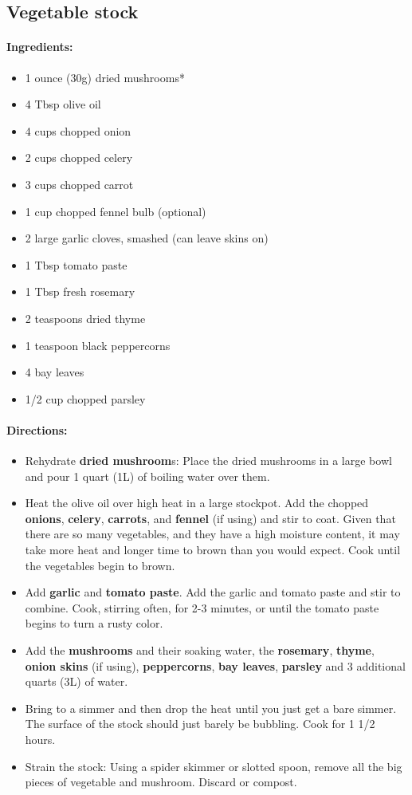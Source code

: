 \documentclass{article}
\begin{document}
\subsection{Vegetable stock}

\paragraph{Ingredients:}
\begin{itemize}
	\item 1 ounce (30g) dried mushrooms*
	\item 4 Tbsp olive oil
	\item 4 cups chopped onion
	\item 2 cups chopped celery
	\item 3 cups chopped carrot
	\item 1 cup chopped fennel bulb (optional)
	\item 2 large garlic cloves, smashed (can leave skins on)
	\item 1 Tbsp tomato paste
	\item 1 Tbsp fresh rosemary
	\item 2 teaspoons dried thyme
	\item 1 teaspoon black peppercorns
	\item 4 bay leaves
	\item 1/2 cup chopped parsley
\end{itemize}

\paragraph{Directions:}
\begin{itemize}
	\item Rehydrate \textbf{dried mushroom}s: Place the dried mushrooms in a large bowl and pour 1 quart (1L) of boiling water over them.
	\item Heat the olive oil over high heat in a large stockpot. Add the chopped \textbf{onions}, \textbf{celery}, \textbf{carrots}, and \textbf{fennel} (if using) and stir to coat. Given that there are so many vegetables, and they have a high moisture content, it may take more heat and longer time to brown than you would expect. Cook until the vegetables begin to brown.
	\item Add \textbf{garlic} and \textbf{tomato paste}. Add the garlic and tomato paste and stir to combine. Cook, stirring often, for 2-3 minutes, or until the tomato paste begins to turn a rusty color.
	\item Add the \textbf{mushrooms} and their soaking water, the \textbf{rosemary}, \textbf{thyme}, \textbf{onion skins} (if using), \textbf{peppercorns},\textbf{ bay leaves}, \textbf{parsley} and 3 additional quarts (3L) of water.
	\item Bring to a simmer and then drop the heat until you just get a bare simmer. The surface of the stock should just barely be bubbling. Cook for 1 1/2 hours.
	\item Strain the stock: Using a spider skimmer or slotted spoon, remove all the big pieces of vegetable and mushroom. Discard or compost.
\end{itemize}
\end{document}
